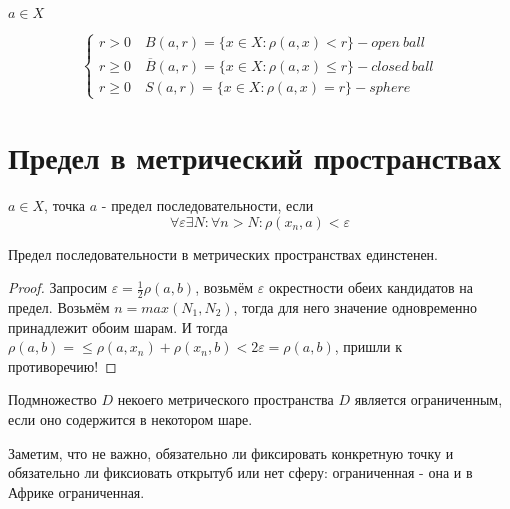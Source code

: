 \documentclass[12pt, a4paper]{article}
\begin{document}
  \begin{definition}
  [Шары]
  $a \in X$

  \begin{equation}
    \begin{cases}
      r > 0 \quad B(a, r) = \{ x \in X: \rho(a, x) < r \} - open ~ ball \\
      r \geqslant 0 \quad \overline{B}(a, r) = \{ x \in X: \rho(a, x) \leqslant r \} - closed ~ ball \\
      r \geqslant 0 \quad S(a, r) = \{ x \in X: \rho(a, x) = r \} - sphere
    \end{cases}
  \end{equation}
  \end{definition}



  \section{Предел в метрический пространствах}

  \begin{definition}
  $a \in X$, точка $a$ - предел последовательности, если 
  \begin{equation}
    \forall \varepsilon \exists N: \forall n > N: \rho(x_n, a) < \varepsilon
  \end{equation}
  \end{definition}

  \begin{theorem}
  Предел последовательности в метрических пространствах единстенен.
  \end{theorem}
  \begin{proof}
  Запросим $\varepsilon = \frac12 \rho(a, b)$, возьмём $\varepsilon$
  окрестности обеих кандидатов на предел.
  Возьмём $n = max(N_1, N_2)$, тогда для него значение одновременно принадлежит обоим шарам.
  И тогда $\rho(a, b) = \leqslant \rho(a, x_n) + \rho(x_n, b) < 2\varepsilon = \rho(a, b)$, пришли к противоречию! \contradiction
  \end{proof}

  \begin{definition}
  Подмножество $D$ некоего метрического пространства $D$ является ограниченным, если оно содержится в некотором шаре.
  \end{definition}
  \begin{note}
  Заметим, что не важно, обязательно ли фиксировать конкретную точку 
  и обязательно ли фиксиовать открытуб или нет сферу: 
  ограниченная - она и в Африке ограниченная.
  \end{note}
\end{document}
